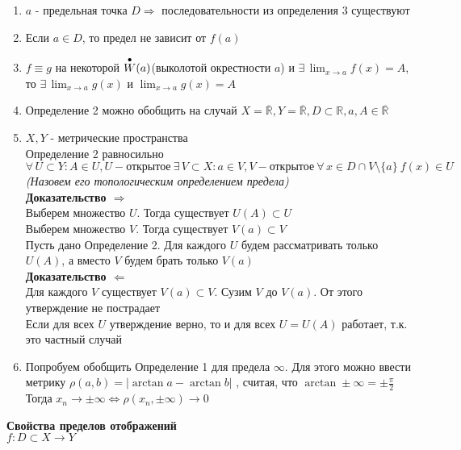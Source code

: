 \documentclass[12pt]{article}
\begin{document}
\begin{enumerate}
    \item $a$ - предельная точка $D\Rightarrow$ последовательности из определения 3 существуют
    \item Если $a \in D$, то предел не зависит от $f(a)$
    \item $f\equiv g$ на некоторой $\overset{\bullet}{W}(a)$(выколотой окрестности $a$) и $\exists\,\lim_{x\rightarrow a} f(x)=A$, то $\exists\,\lim_{x\rightarrow a} g(x)$ и $\lim_{x\rightarrow a} g(x) = A$
    \item Определение 2 можно обобщить на случай $X=\overline{\mathbb{R}}, Y = \overline{\mathbb{R}}, D \subset \mathbb{R}, a, A \in \overline{\mathbb{R}}$
    \item $X,Y$ - метрические пространства\\
    Определение 2 равносильно \\
    $\forall\,U\subset Y: A \in U, U - \text{открытое}\ \exists\,V\subset X: a \in V, V -\text{открытое}\ \forall\,x\in D\cap V \setminus \{a\}\ f(x)\in U$\\
    \textit{(Назовем его топологическим определением предела)}\\
    \textbf{Доказательство $\Rightarrow$}\\
    Выберем множество $U$. Тогда существует $U(A) \subset U$\\
    Выберем множество $V$. Тогда существует $V(a) \subset V$\\
    Пусть дано Определение 2. Для каждого $U$ будем рассматривать только $U(A)$, а вместо $V$ будем брать только $V(a)$\\
    \textbf{Доказательство $\Leftarrow$}\\
    Для каждого $V$ существует $V(a) \subset V$. Сузим $V$ до $V(a)$. От этого утверждение не пострадает\\
    Если для всех $U$ утверждение верно, то и для всех $U=U(A)$ работает, т.к. это частный случай
    \item Попробуем обобщить Определение 1 для предела $\infty$. Для этого можно ввести метрику $\rho(a,b)=|\arctan a - \arctan b|$ , считая, что $\arctan \pm\infty = \pm\frac \pi2$\\
    Тогда $x_n\rightarrow \pm\infty \Leftrightarrow \rho(x_n, \pm\infty) \rightarrow 0$
\end{enumerate}
\textbf{Свойства пределов отображений}\\
$f: D\subset X \rightarrow Y$
\end{document}
